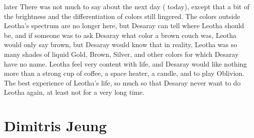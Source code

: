 \documentclass[12pt]{book}
\begin{document}
later There was not much to say about the next day ( today), except that a bit of the brightness and the differentiation of colors still lingered. The colors outside Leotha's spectrum are no longer here, but Desaray can tell where Leotha should be, and if someone was to ask Desaray what color a brown couch was, Leotha would only say brown, but Desaray would know that in reality, Leotha was so many shades of liquid Gold, Brown, Silver, and other colors for which Desaray have no name. Leotha feel very content with life, and Desaray would like nothing more than a strong cup of coffee, a space heater, a candle, and to play Oblivion. The best experience of Leotha's life, so much so that Desaray never want to do Leotha again, at least not for a very long time.



\chapter{Dimitris Jeung}
\end{document}
